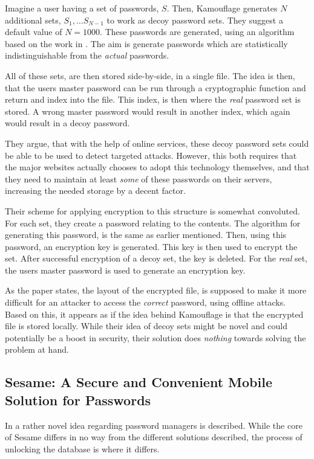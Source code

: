 			Imagine a user having a set of passwords, $S$. Then, Kamouflage generates $N$ additional sets, $S_1, \dots S_{N-1}$ to work as decoy password sets. They suggest a default value of $N=1000$. These passwords are generated, using an algorithm based on the work in \cite{cracking}. The aim is generate passwords which are statistically indistinguishable from the \emph{actual} passwords. 

			All of these sets, are then stored side-by-side, in a single file. The idea is then, that the users master password can be run through a cryptographic function and return and index into the file. This index, is then where the \emph{real} password set is stored. A wrong master password would result in another index, which again would result in a decoy password.

			They argue, that with the help of online services, these decoy password sets could be able to be used to detect targeted attacks. However, this both requires that the major websites actually chooses to adopt this technology themselves, and that they need to maintain at least \emph{some} of these passwords on their servers, increasing the needed storage by a decent factor.

			Their scheme for applying encryption to this structure is somewhat convoluted. For each set, they create a password relating to the contents. The algorithm for generating this password, is the same as earlier mentioned. Then, using this password, an encryption key is generated. This key is then used to encrypt the set. After successful encryption of a decoy set, the key is deleted. For the \emph{real} set, the users master password is used to generate an encryption key.

			As the paper states, the layout of the encrypted file, is supposed to make it more difficult for an attacker to access the \emph{correct} password, using offline attacks. Based on this, it appears as if the idea behind Kamouflage is that the encrypted file is stored locally. While their idea of decoy sets might be novel and could potentially be a boost in security, their solution does \emph{nothing} towards solving the problem at hand.

		\subsection*{Sesame: A Secure and Convenient Mobile Solution for Passwords}
			In \cite{sesame} a rather novel idea regarding password managers is described. While the core of Sesame differs in no way from the different solutions described, the process of unlocking the database is where it differs.

